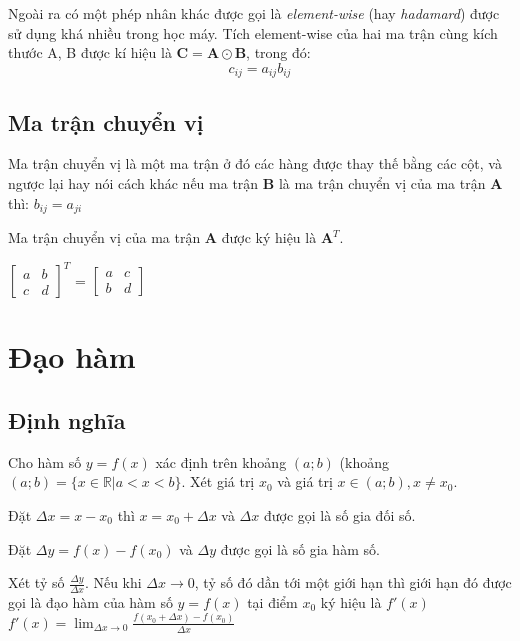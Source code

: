 Ngoài ra có một phép nhân khác được gọi là \textit{element-wise} (hay \textit{hadamard}) được sử dụng khá nhiều trong học máy. Tích element-wise của hai ma trận cùng kích thước A, B được kí hiệu là $\textbf{C}=\textbf{A} \odot \textbf{B}$, trong đó:
\begin{equation*}
c_{ij}=a_{ij}b_{ij}
\end{equation*}
\subsection{Ma trận chuyển vị}
 Ma trận chuyển vị là một ma trận ở đó các hàng được thay thế bằng các cột, và ngược lại hay nói cách khác nếu ma trận \textbf{B} là ma trận chuyển vị của ma trận \textbf{A} thì: $b_{ij} = a_{ji}$ \par
Ma trận chuyển vị của ma trận $\textbf{A}$ được ký hiệu là $\textbf{A}^T$.\\ \par

$\begin{bmatrix}
a & b\\ c&d
\end{bmatrix}^T$
=
$\begin{bmatrix}
a&c\\b&d
\end{bmatrix}$
\section{Đạo hàm}
\subsection{Định nghĩa}
 Cho hàm số ${ y=f(x)}$ xác định trên khoảng ${ (a;b)}$ (khoảng ${  (a;b)=\{x\in \mathbb {R} |a<x<b\}}$. Xét giá trị ${  x_{0}}$ và giá trị ${  x\in (a;b),x\neq x_{0}}$. \par 

Đặt $   \Delta x=x-x_0$ thì $  x = x_0+\Delta x$ và $\Delta x$ được gọi là số gia đối số. \par

Đặt $  \Delta y = f(x)-f(x_0)$ và $\Delta y$ được gọi là số gia hàm số. \par

Xét tỷ số ${  {\frac {\Delta y}{\Delta x}}}$. Nếu khi $  \Delta x\rightarrow0$, tỷ số đó dần tới một giới hạn thì giới hạn đó được gọi là đạo hàm của hàm số $  y=f(x)$ tại điểm $  x_0$ ký hiệu là ${  f'(x)}$\\

${  f'(x)=\lim _{\Delta x\rightarrow 0}{\frac {f(x_{0}+\Delta x)-f(x_{0})}{\Delta x}}}  $
